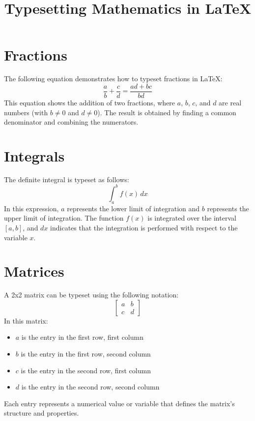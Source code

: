 \documentclass{article}
\title{Typesetting Mathematics in LaTeX}
\begin{document}
\maketitle

\section{Fractions}
The following equation demonstrates how to typeset fractions in LaTeX:
\[
\frac{a}{b} + \frac{c}{d} = \frac{ad + bc}{bd}
\]
This equation shows the addition of two fractions, where $a$, $b$, $c$, and $d$ are real numbers (with $b \neq 0$ and $d \neq 0$). The result is obtained by finding a common denominator and combining the numerators.

\section{Integrals}
The definite integral is typeset as follows:
\[
\int_{a}^{b} f(x) \, dx
\]
In this expression, $a$ represents the lower limit of integration and $b$ represents the upper limit of integration. The function $f(x)$ is integrated over the interval $[a, b]$, and $dx$ indicates that the integration is performed with respect to the variable $x$.

\section{Matrices}
A 2x2 matrix can be typeset using the following notation:
\[
\begin{bmatrix}
a & b \\
c & d
\end{bmatrix}
\]
In this matrix:
\begin{itemize}
    \item $a$ is the entry in the first row, first column
    \item $b$ is the entry in the first row, second column
    \item $c$ is the entry in the second row, first column
    \item $d$ is the entry in the second row, second column
\end{itemize}
Each entry represents a numerical value or variable that defines the matrix's structure and properties.
\end{document}
